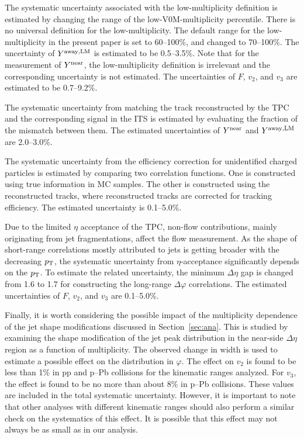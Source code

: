 The systematic uncertainty associated with the low-multiplicity definition is estimated by changing the range of the low-V0M-multiplicity percentile. There is no universal definition for the low-multiplicity. The default range for the low-multiplicity in the present paper is set to 60--100\%, and changed to 70--100\%. The uncertainty of $Y^{\rm{away,LM}}$ is estimated to be 0.5--3.5\%. Note that for the measurement of $Y^{\rm{near}}$, the low-multiplicity definition is irrelevant and the corresponding uncertainty is not estimated. The uncertainties of $F$, $v_{2}$, and $v_{3}$ are estimated to be 0.7--9.2\%.

The systematic uncertainty from matching the track reconstructed by the TPC and the corresponding signal in the ITS is estimated by evaluating the fraction of the mismatch between them. The estimated uncertainties of $Y^{\rm{near}}$ and $Y^{\rm{away,LM}}$ are 2.0--3.0\%.

The systematic uncertainty from the efficiency correction for unidentified charged particles is estimated by comparing two correlation functions. One is constructed using true information in MC samples. The other is constructed using the reconstructed tracks, where reconstructed tracks are corrected for tracking efficiency. The estimated uncertainty is 0.1--5.0\%.

Due to the limited $\eta$ acceptance of the TPC, non-flow contributions, mainly originating from jet fragmentations, affect the flow measurement. As the shape of short-range correlations mostly attributed to jets is getting broader with the decreasing $p_\mathrm{T}$, the systematic uncertainty from $\eta$-acceptance significantly depends on the $p_{\rm{T}}$. To estimate the related uncertainty, the minimum $\Delta\eta$ gap is changed from 1.6 to 1.7 for constructing the long-range $\Delta\varphi$ correlations.  The estimated uncertainties of $F$, $v_{2}$, and $v_{3}$ are 0.1--5.0\%.

Finally, it is worth considering the possible impact of the multiplicity dependence of the jet shape modifications discussed in Section~\ref{sec:ana}. This is studied by examining the shape modification of the jet peak distribution in the near-side $\Delta\eta$ region as a function of  multiplicity. The observed change in width is used to estimate a possible effect on the distribution in $\varphi$. The effect on $v_2$ is found to be less than 1$\%$ in pp and p--Pb collisions for the kinematic ranges analyzed. For $v_3$, the effect is found to be no more than about 8$\%$ in p--Pb collisions. These values are included in the total systematic uncertainty. However, it is important to note that other analyses with different kinematic ranges should also perform a similar check on the systematics of this effect. It is possible that this effect may not always be as small as in our analysis.






